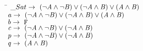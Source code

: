 \begin{subfigure}[t]{\textwidth}
  \begin{tabbing}
  \qquad \qquad \= $\_Sat \rightarrow\ (\neg \mathit{A}{} \wedge \neg \mathit{B}{}) \vee (\neg \mathit{A}{} \wedge \mathit{B}{}) \vee (\mathit{A}{} \wedge \mathit{B})$ \\
  \> $\mathit{a}{} \rightarrow\ (\neg \mathit{A}{} \wedge \neg \mathit{B}{}) \vee (\neg \mathit{A}{} \wedge \mathit{B}{}) \vee (\mathit{A}{} \wedge \mathit{B})$ \\
  \> $\mathit{b}{} \rightarrow\ \texttt{F}{}$ \\
  \> $\mathit{c}{} \rightarrow\ (\neg{} \mathit{A}{} \wedge{} \neg{} \mathit{B}{}) \vee{} (\neg{} \mathit{A}{} \wedge{} \mathit{B}{})$ \\
  \> $\mathit{p}{} \rightarrow\ (\neg \mathit{A}{} \wedge \neg \mathit{B}{}) \vee (\neg \mathit{A}{} \wedge \mathit{B}{})$ \\
  \> $\mathit{q}{} \rightarrow\ (\mathit{A}{} \wedge \mathit{B})$
\end{tabbing}
\end{subfigure}

